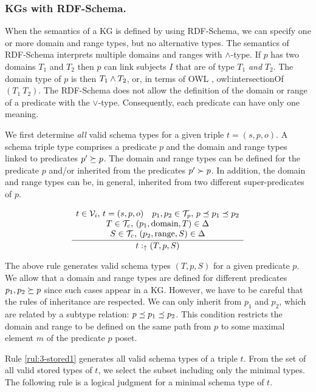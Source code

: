 \documentclass[runningheads]{llncs}
\newcommand{\uarr}{\uparrow}
\newcommand{\V}{{\cal V}}
\newcommand{\TT}{{\cal T}}
\begin{document}
\subsubsection{KGs with RDF-Schema.}

When the semantics of a KG is defined by using RDF-Schema, we can
specify one or more domain and range types, but no alternative
types. The semantics of RDF-Schema \cite{rdfsemantics} interprets
multiple domains and ranges with $\land$-type. If $p$ has two domains
$T_1$ and $T_2$ then $p$ can link subjects $I$ that are of type $T_1$
\emph{and} $T_2$. The domain type of $p$ is then $T_1\land\/T_2$, or,
in terms of OWL \cite{owl}, owl:intersectionOf$(T_1\ T_2)$. The
RDF-Schema does not allow the definition of the domain or range of a
predicate with the $\lor$-type. Consequently, each predicate can have
only one meaning.

We first determine \emph{all} valid schema types for a given triple
$t=(s,p,o)$. A schema triple type comprises a predicate $p$ and the
domain and range types linked to predicates $p'\succeq\/p$. The domain
and range types can be defined for the predicate $p$ and/or inherited
from the predicates $p'\succ\/p$. In addition, the domain and range
types can be, in general, inherited from two different
super-predicates of $p$.

\begin{equation}
\label{rul:3-stored1}
\dfrac{\begin{array}{c}
       t\in\V_i,\, t=(s,p,o)\quad p_1,p_2\in\TT_p,\, p\preceq\/p_1\preceq\/p_2 \\
       T\in\TT_c,\, (p_1,\text{domain},T)\in\/\Delta \\
       S\in\TT_c,\, (p_2,\text{range},S)\in\Delta
       \end{array}}
      {t:_\uarr\/(T,p,S)}
\end{equation}

The above rule generates valid schema types $(T,p,S)$ for a given
predicate $p$. We allow that a domain and range types are defined for
different predicates $p_1,p_2\succeq\/p$ since such cases appear in a
KG. However, we have to be careful that the rules of inheritance are
respected. We can only inherit from $p_1$ and $p_2$, which are related
by a subtype relation: $p\preceq\/p_1\preceq\/p_2$. This condition
restricts the domain and range to be defined on the same path from $p$
to some maximal element $m$ of the predicate $p$ poset.

Rule \ref{rul:3-stored1} generates all valid schema types of
a triple $t$. From the set of all valid stored types of $t$, we select
the subset including only the minimal types. The following rule is a
logical judgment for a minimal schema type of $t$. 
\end{document}
